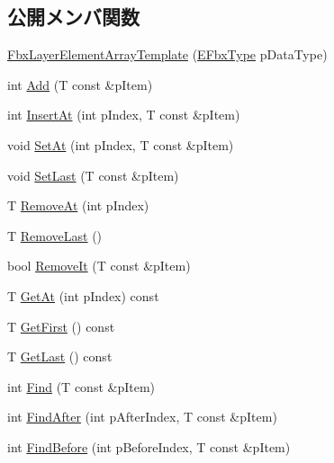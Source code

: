 \subsection*{公開メンバ関数}
\begin{DoxyCompactItemize}
\item 
\hyperlink{class_fbx_layer_element_array_template_a624afc7ae56a5caacacd69bcb8bf9ba8}{Fbx\+Layer\+Element\+Array\+Template} (\hyperlink{fbxpropertytypes_8h_a73913a5ddfb20e57c6f25e9e6784bd92}{E\+Fbx\+Type} p\+Data\+Type)
\item 
int \hyperlink{class_fbx_layer_element_array_template_acc403e924944fe9921dac121156bf963}{Add} (T const \&p\+Item)
\item 
int \hyperlink{class_fbx_layer_element_array_template_adaf1260a3a9f1c68f9809ddaf051ac61}{Insert\+At} (int p\+Index, T const \&p\+Item)
\item 
void \hyperlink{class_fbx_layer_element_array_template_a70cf4f9a1b142eff8adae13ad1a79e6d}{Set\+At} (int p\+Index, T const \&p\+Item)
\item 
void \hyperlink{class_fbx_layer_element_array_template_a90c76493799f15b6345c83dc242f7b7c}{Set\+Last} (T const \&p\+Item)
\item 
T \hyperlink{class_fbx_layer_element_array_template_a2ebd201d3d664e9b171d50561bfad1de}{Remove\+At} (int p\+Index)
\item 
T \hyperlink{class_fbx_layer_element_array_template_ac5f508f41799c5f3f2e0c045ab874063}{Remove\+Last} ()
\item 
bool \hyperlink{class_fbx_layer_element_array_template_abecc76d8203687b7963f2c4fa2d43a1e}{Remove\+It} (T const \&p\+Item)
\item 
T \hyperlink{class_fbx_layer_element_array_template_a68180d4ec375c231a49ce117503a1aa8}{Get\+At} (int p\+Index) const
\item 
T \hyperlink{class_fbx_layer_element_array_template_a76cc225d2f45a40ef77ecce9bb1dd971}{Get\+First} () const
\item 
T \hyperlink{class_fbx_layer_element_array_template_a3dc0296d72de9a084d5afedaba6f5900}{Get\+Last} () const
\item 
int \hyperlink{class_fbx_layer_element_array_template_a60e464ae7d193fa397d2099c760482d6}{Find} (T const \&p\+Item)
\item 
int \hyperlink{class_fbx_layer_element_array_template_a76bad491c68ab608c7f07daf7e659bfe}{Find\+After} (int p\+After\+Index, T const \&p\+Item)
\item 
int \hyperlink{class_fbx_layer_element_array_template_a27a66a52ff1642fd6a5ed7c34d72c3c7}{Find\+Before} (int p\+Before\+Index, T const \&p\+Item)

\end{DoxyCompactItemize}

